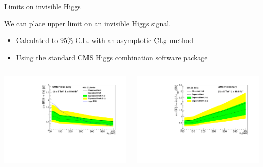 \documentclass[8pt]{beamer}
\begin{document}
\begin{frame}{Limits on invisible Higgs}
 
We can place upper limit on an invisible Higgs signal.  
\begin{itemize}
 \item Calculated to 95\% C.L. with an asymptotic ${\rm CL}_{\rm S}$ method
 \item Using the standard CMS Higgs combination software package 
\end{itemize}
 
\begin{columns}
 
\begin{block}
 
\centering
\includegraphics[width=\linewidth]{img/XSLimit.pdf} 

\end{block}

\begin{block}
 
\centering
\includegraphics[width=\linewidth]{img/xsiLimit.pdf} 


\end{block}
\end{columns}
\end{frame}
\end{document}
